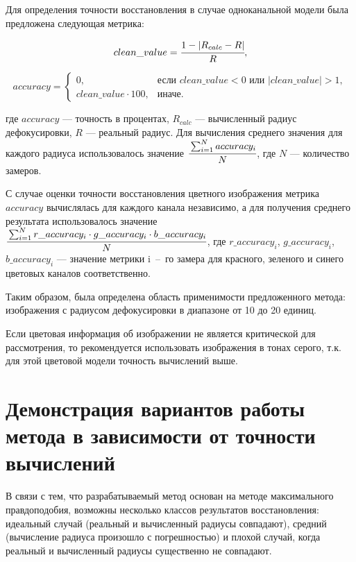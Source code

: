 Для определения точности восстановления в случае одноканальной модели была предложена следующая метрика:

\begin{equation}
	clean\_value = \cfrac{1 - |R_{calc} - R|}{R},
\end{equation}

\begin{equation}
	accuracy = 
	\begin{cases}
		0, & \text{если } clean\_value < 0 \text{ или } |clean\_value| > 1,\\
		clean\_value \cdot 100, & \text{иначе}.
	\end{cases}
\end{equation}

где $accuracy$ --- точность в процентах, $R_{calc}$ --- вычисленный радиус дефокусировки, $R$ --- реальный радиус. Для вычисления среднего значения для каждого радиуса использовалось значение $\cfrac{\sum_{i=1}^{N}accuracy_i}{N}$, где $N$ --- количество замеров. 

С случае оценки точности восстановления цветного изображения метрика $accuracy$ вычислялась для каждого канала независимо, а для получения среднего результата использовалось значение $\cfrac{\sum_{i=1}^{N}r\_accuracy_i\cdot g\_accuracy_i\cdot b\_accuracy_i}{N}$, где $r\_accuracy_i$, $g\_accuracy_i$, $b\_accuracy_i$ --- значение метрики i~--~го замера для красного, зеленого и синего цветовых каналов соответственно.

Таким образом, была определена область применимости предложенного метода: изображения с радиусом дефокусировки в диапазоне от 10 до 20 единиц. 

Если цветовая информация об изображении не является критической для рассмотрения, то рекомендуется использовать изображения в тонах серого, т.к. для этой цветовой модели точность вычислений выше.

\clearpage

\section{Демонстрация вариантов работы метода в зависимости от точности вычислений}

В связи с тем, что разрабатываемый метод основан на методе максимального правдоподобия, возможны несколько классов результатов восстановления: идеальный случай (реальный и вычисленный радиусы совпадают), средний (вычисление радиуса произошло с погрешностью) и плохой случай, когда реальный и вычисленный радиусы существенно не совпадают.


